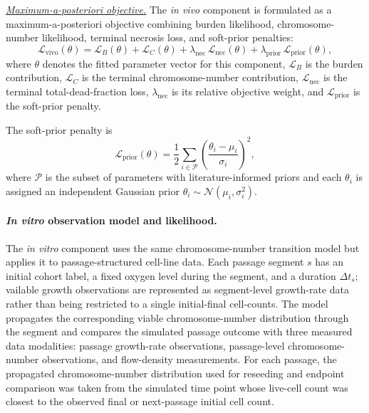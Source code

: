 \documentclass[11pt]{article}
\begin{document}
\underline{\textit{Maximum-a-posteriori objective.}} The \textit{in vivo} component is formulated as a maximum-a-posteriori objective combining burden likelihood, chromosome-number likelihood, terminal necrosis loss, and soft-prior penalties:
\begin{equation}
\mathcal L_{\mathrm{vivo}}(\theta)
=
\mathcal L_B(\theta)
+ 
\mathcal L_C(\theta)
+
\lambda_{\mathrm{nec}}
\,
\mathcal L_{\mathrm{nec}}(\theta)
+ 
\lambda_{\mathrm{prior}}
\,
\mathcal L_{\mathrm{prior}}(\theta),
\label{eq:appendix_objective}
\end{equation}
where $\theta$ denotes the fitted parameter vector for this component, $\mathcal L_B$ is the burden contribution, $\mathcal L_C$ is the terminal chromosome-number contribution, $\mathcal L_{\mathrm{nec}}$ is the terminal total-dead-fraction loss, $\lambda_{\mathrm{nec}}$ is its relative objective weight, and $\mathcal L_{\mathrm{prior}}$ is the soft-prior penalty.


The soft-prior penalty is
\begin{equation}
\mathcal{L}_{\mathrm{prior}}(\theta)
=
\frac{1}{2}
\sum_{i \in \mathcal{P}}
\left(
\frac{\theta_i - \mu_i}{\sigma_i}
\right)^2 ,
\label{eq:prior_penalty}
\end{equation}
where $\mathcal{P}$ is the subset of parameters with literature-informed priors and each $\theta_i$ is assigned an independent Gaussian prior $\theta_i\sim\mathcal N(\mu_i,\sigma_i^2)$.

\paragraph{\textit{In vitro} observation model and likelihood.}

The \textit{in vitro} component uses the same chromosome-number transition model but applies it to passage-structured cell-line data. Each passage segment $s$ has an initial cohort label, a fixed oxygen level during the segment, and a duration $\Delta t_s$; vailable growth observations are represented as segment-level growth-rate data rather than being restricted to a single initial-final cell-counts. The model propagates the corresponding viable chromosome-number distribution through the segment and compares the simulated passage outcome with three measured data modalities: passage growth-rate observations, passage-level chromosome-number observations, and flow-density measurements. For each passage, the propagated chromosome-number distribution used for reseeding and endpoint comparison was taken from the simulated time point whose live-cell count was closest to the observed final or next-passage initial cell count.
\end{document}
